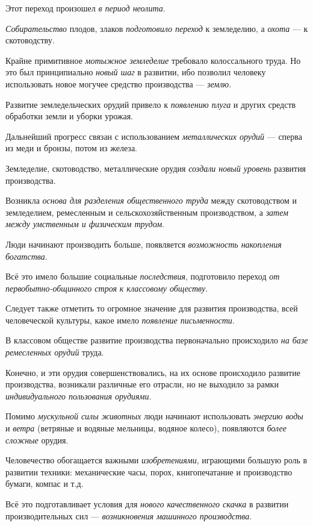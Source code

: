 \documentclass[a4paper,14pt,russian]{extreport}
\begin{document}
Этот переход произошел \emph{в период неолита}.

\emph{Собирательство} плодов, злаков \emph{подготовило переход} к земледелию, а \emph{охота} --- к скотоводству.

Крайне примитивное \emph{мотыжное земледелие} требовало колоссального труда. Но это был принципиально \emph{новый шаг} в развитии, ибо позволил человеку использовать новое могучее средство производства --- \emph{землю}.

Развитие земледельческих орудий привело к \emph{появлению плуга} и других средств обработки земли и уборки урожая.

Дальнейший прогресс связан с использованием \emph{металлических орудий} --- сперва из меди и бронзы, потом из железа.

Земледелие, скотоводство, металлические орудия \emph{создали новый уровень} развития производства.

Возникла \emph{основа для разделения общественного труда} между скотоводством и земледелием, ремесленным и сельскохозяйственным производством, а \emph{затем между умственным и физическим трудом}.

Люди начинают производить больше, появляется \emph{возможность накопления} \emph{богатства}.

Всё это имело большие социальные \emph{последствия}, подготовило переход \emph{от первобытно-общинного строя} \emph{к классовому обществу}.

Следует также отметить то огромное значение для развития производства, всей человеческой культуры, какое имело \emph{появление письменности}.

В классовом обществе развитие производства первоначально происходило \emph{на базе ремесленных орудий} труда.

Конечно, и эти орудия совершенствовались, на их основе происходило развитие производства, возникали различные его отрасли, но не выходило за рамки \emph{индивидуального пользования орудиями}.

Помимо \emph{мускульной силы животных} люди начинают использовать \emph{энергию воды} и \emph{ветра} (ветряные и водяные мельницы, водяное колесо), появляются \emph{более сложные} орудия.

Человечество обогащается важными \emph{изобретениями}, играющими большую роль в развитии техники: механические часы, порох, книгопечатание и производство бумаги, компас и т.д.

Всё это подготавливает условия для \emph{нового качественного скачка} в развитии производительных сил --- \emph{возникновения машинного производства}.
\end{document}
